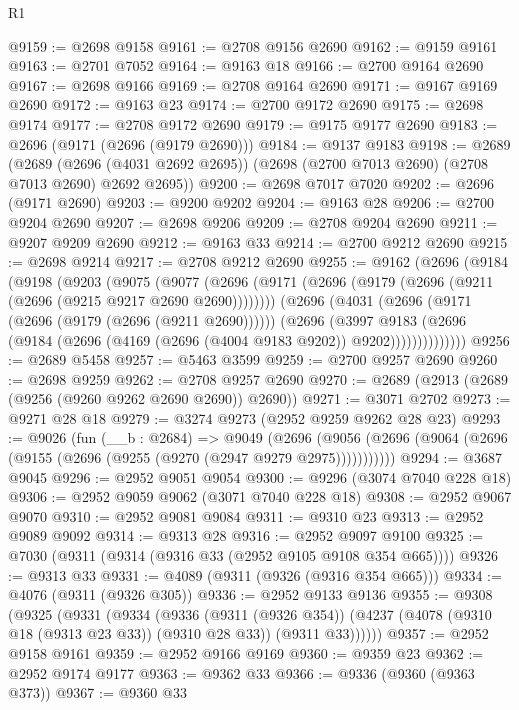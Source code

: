 \begin{lexlean}{R1}
\begin{coremodule}
@9159 := @2698 @9158
@9161 := @2708 @9156 @2690
@9162 := @9159 @9161
@9163 := @2701 @7052
@9164 := @9163 @18
@9166 := @2700 @9164 @2690
@9167 := @2698 @9166
@9169 := @2708 @9164 @2690
@9171 := @9167 @9169 @2690
@9172 := @9163 @23
@9174 := @2700 @9172 @2690
@9175 := @2698 @9174
@9177 := @2708 @9172 @2690
@9179 := @9175 @9177 @2690
@9183 := @2696 (@9171 (@2696 (@9179 @2690)))
@9184 := @9137 @9183
@9198 := @2689
    (@2689 (@2696 (@4031 @2692 @2695)) (@2698 (@2700 @7013 @2690) (@2708 @7013 @2690) @2692 @2695))
@9200 := @2698 @7017 @7020
@9202 := @2696 (@9171 @2690)
@9203 := @9200 @9202
@9204 := @9163 @28
@9206 := @2700 @9204 @2690
@9207 := @2698 @9206
@9209 := @2708 @9204 @2690
@9211 := @9207 @9209 @2690
@9212 := @9163 @33
@9214 := @2700 @9212 @2690
@9215 := @2698 @9214
@9217 := @2708 @9212 @2690
@9255 := @9162
    (@2696
      (@9184
        (@9198
          (@9203
            (@9075
              (@9077
                (@2696 (@9171 (@2696 (@9179 (@2696 (@9211 (@2696 (@9215 @9217 @2690 @2690))))))))
                (@2696
                  (@4031
                    (@2696 (@9171 (@2696 (@9179 (@2696 (@9211 @2690))))))
                    (@2696
                      (@3997
                        @9183
                        (@2696 (@9184 (@2696 (@4169 (@2696 (@4004 @9183 @9202)) @9202))))))))))))))
@9256 := @2689 @5458
@9257 := @5463 @3599
@9259 := @2700 @9257 @2690
@9260 := @2698 @9259
@9262 := @2708 @9257 @2690
@9270 := @2689 (@2913 (@2689 (@9256 (@9260 @9262 @2690 @2690)) @2690))
@9271 := @3071 @2702
@9273 := @9271 @28 @18
@9279 := @3274 @9273 (@2952 @9259 @9262 @28 @23)
@9293 := @9026
    (fun (__b : @2684) =>
    @9049
      (@2696 (@9056 (@2696 (@9064 (@2696 (@9155 (@2696 (@9255 (@9270 (@2947 @9279 @2975)))))))))))
@9294 := @3687 @9045
@9296 := @2952 @9051 @9054
@9300 := @9296 (@3074 @7040 @228 @18)
@9306 := @2952 @9059 @9062 (@3071 @7040 @228 @18)
@9308 := @2952 @9067 @9070
@9310 := @2952 @9081 @9084
@9311 := @9310 @23
@9313 := @2952 @9089 @9092
@9314 := @9313 @28
@9316 := @2952 @9097 @9100
@9325 := @7030 (@9311 (@9314 (@9316 @33 (@2952 @9105 @9108 @354 @665))))
@9326 := @9313 @33
@9331 := @4089 (@9311 (@9326 (@9316 @354 @665)))
@9334 := @4076 (@9311 (@9326 @305))
@9336 := @2952 @9133 @9136
@9355 := @9308
    (@9325
      (@9331
        (@9334
          (@9336
            (@9311 (@9326 @354))
            (@4237 (@4078 (@9310 @18 (@9313 @23 @33)) (@9310 @28 @33)) (@9311 @33))))))
@9357 := @2952 @9158 @9161
@9359 := @2952 @9166 @9169
@9360 := @9359 @23
@9362 := @2952 @9174 @9177
@9363 := @9362 @33
@9366 := @9336 (@9360 (@9363 @373))
@9367 := @9360 @33

\end{coremodule}
\end{lexlean}

